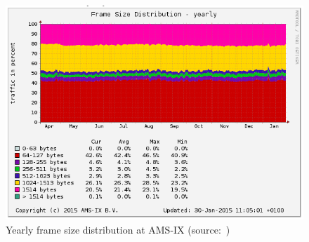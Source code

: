 \begin{figure}
	\centering
	\includegraphics[width=14.5cm,keepaspectratio]{fig/amsix.png}
	\caption{Yearly frame size distribution at AMS-IX (source:~\cite{amsix-frame-size})}
	\label{fig:analysis-amsix-frame-size}
\end{figure}
